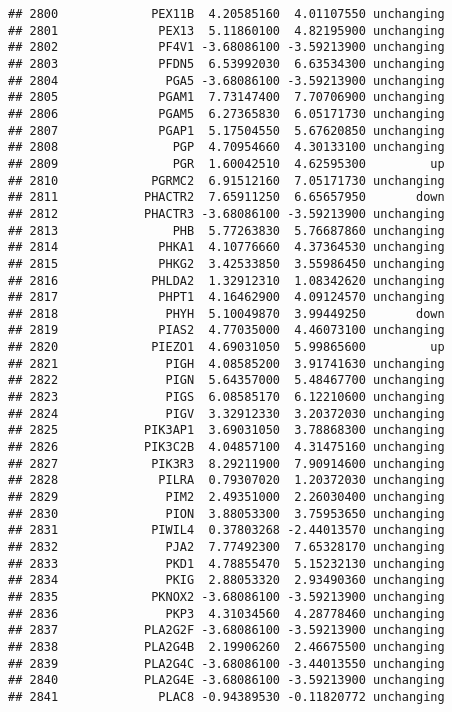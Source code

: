 \documentclass[]{article}
\begin{document}
\begin{verbatim}
## 2800             PEX11B  4.20585160  4.01107550 unchanging
## 2801              PEX13  5.11860100  4.82195900 unchanging
## 2802              PF4V1 -3.68086100 -3.59213900 unchanging
## 2803              PFDN5  6.53992030  6.63534300 unchanging
## 2804               PGA5 -3.68086100 -3.59213900 unchanging
## 2805              PGAM1  7.73147400  7.70706900 unchanging
## 2806              PGAM5  6.27365830  6.05171730 unchanging
## 2807              PGAP1  5.17504550  5.67620850 unchanging
## 2808                PGP  4.70954660  4.30133100 unchanging
## 2809                PGR  1.60042510  4.62595300         up
## 2810             PGRMC2  6.91512160  7.05171730 unchanging
## 2811            PHACTR2  7.65911250  6.65657950       down
## 2812            PHACTR3 -3.68086100 -3.59213900 unchanging
## 2813                PHB  5.77263830  5.76687860 unchanging
## 2814              PHKA1  4.10776660  4.37364530 unchanging
## 2815              PHKG2  3.42533850  3.55986450 unchanging
## 2816             PHLDA2  1.32912310  1.08342620 unchanging
## 2817              PHPT1  4.16462900  4.09124570 unchanging
## 2818               PHYH  5.10049870  3.99449250       down
## 2819              PIAS2  4.77035000  4.46073100 unchanging
## 2820             PIEZO1  4.69031050  5.99865600         up
## 2821               PIGH  4.08585200  3.91741630 unchanging
## 2822               PIGN  5.64357000  5.48467700 unchanging
## 2823               PIGS  6.08585170  6.12210600 unchanging
## 2824               PIGV  3.32912330  3.20372030 unchanging
## 2825            PIK3AP1  3.69031050  3.78868300 unchanging
## 2826            PIK3C2B  4.04857100  4.31475160 unchanging
## 2827             PIK3R3  8.29211900  7.90914600 unchanging
## 2828              PILRA  0.79307020  1.20372030 unchanging
## 2829               PIM2  2.49351000  2.26030400 unchanging
## 2830               PION  3.88053300  3.75953650 unchanging
## 2831             PIWIL4  0.37803268 -2.44013570 unchanging
## 2832               PJA2  7.77492300  7.65328170 unchanging
## 2833               PKD1  4.78855470  5.15232130 unchanging
## 2834               PKIG  2.88053320  2.93490360 unchanging
## 2835             PKNOX2 -3.68086100 -3.59213900 unchanging
## 2836               PKP3  4.31034560  4.28778460 unchanging
## 2837            PLA2G2F -3.68086100 -3.59213900 unchanging
## 2838            PLA2G4B  2.19906260  2.46675500 unchanging
## 2839            PLA2G4C -3.68086100 -3.44013550 unchanging
## 2840            PLA2G4E -3.68086100 -3.59213900 unchanging
## 2841              PLAC8 -0.94389530 -0.11820772 unchanging

\end{verbatim}
\end{document}
